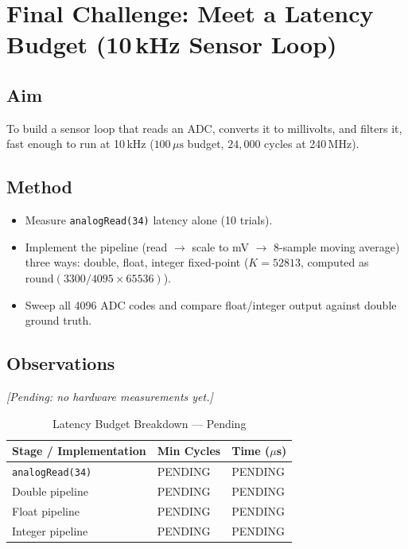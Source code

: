 \section{Final Challenge: Meet a Latency Budget (10\,kHz Sensor Loop)}

\subsection{Aim}
To build a sensor loop that reads an ADC, converts it to millivolts, and filters it, fast enough to run at 10\,kHz ($100\,\mu\text{s}$ budget, $24{,}000$ cycles at 240\,MHz).

\subsection{Method}
\begin{itemize}[noitemsep]
    \item Measure \texttt{analogRead(34)} latency alone (10 trials).
    \item Implement the pipeline (read $\to$ scale to mV $\to$ 8-sample moving average) three ways: double, float, integer fixed-point ($K = 52813$, computed as $\text{round}(3300/4095 \times 65536)$).
    \item Sweep all 4096 ADC codes and compare float/integer output against double ground truth.
\end{itemize}

\subsection{Observations}
\textit{[Pending: no hardware measurements yet.]}

\begin{table}[htbp]
\centering
\caption{Latency Budget Breakdown --- Pending}
\label{tab:final_obs}
\small
\begin{tabularx}{\textwidth}{l X X}
\toprule
\textbf{Stage / Implementation} & \textbf{Min Cycles} & \textbf{Time ($\mu$s)} \\
\midrule
\texttt{analogRead(34)} & PENDING & PENDING \\
Double pipeline & PENDING & PENDING \\
Float pipeline & PENDING & PENDING \\
Integer pipeline & PENDING & PENDING \\
\bottomrule
\end{tabularx}
\end{table}

